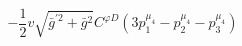 %
\begin{dmath*}
%
  -  \frac{1}{2} v \sqrt{{\bar g}^{\prime 2} + {\bar g}{}^2}C^{ \varphi  D} \left(3 p_1^{\mu_4} - p_2^{\mu_4} - p_3^{\mu_4}\right)
%
\end{dmath*}
%
